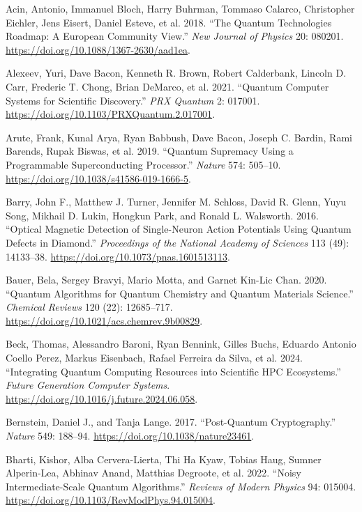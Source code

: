 \documentclass[
  11pt,
  letterpaper,
]{article}
\newlength{\cslhangindent}
\newenvironment{CSLReferences}[2] %
 {\begin{list}{}{%
  \setlength{\itemindent}{0pt}
  \setlength{\leftmargin}{0pt}
  \setlength{\parsep}{0pt}
  \ifodd #1
   \setlength{\leftmargin}{\cslhangindent}
   \setlength{\itemindent}{-1\cslhangindent}
  \fi
  \setlength{\itemsep}{#2\baselineskip}}}
 {\end{list}}
\begin{document}
\label{refs}
\begin{CSLReferences}{1}{0}
Acin, Antonio, Immanuel Bloch, Harry Buhrman, Tommaso Calarco,
Christopher Eichler, Jens Eisert, Daniel Esteve, et al. 2018. {``The
Quantum Technologies Roadmap: A European Community View.''} \emph{New
Journal of Physics} 20: 080201.
\url{https://doi.org/10.1088/1367-2630/aad1ea}.

Alexeev, Yuri, Dave Bacon, Kenneth R. Brown, Robert Calderbank, Lincoln
D. Carr, Frederic T. Chong, Brian DeMarco, et al. 2021. {``Quantum
Computer Systems for Scientific Discovery.''} \emph{PRX Quantum} 2:
017001. \url{https://doi.org/10.1103/PRXQuantum.2.017001}.

Arute, Frank, Kunal Arya, Ryan Babbush, Dave Bacon, Joseph C. Bardin,
Rami Barends, Rupak Biswas, et al. 2019. {``Quantum Supremacy Using a
Programmable Superconducting Processor.''} \emph{Nature} 574: 505--10.
\url{https://doi.org/10.1038/s41586-019-1666-5}.

Barry, John F., Matthew J. Turner, Jennifer M. Schloss, David R. Glenn,
Yuyu Song, Mikhail D. Lukin, Hongkun Park, and Ronald L. Walsworth.
2016. {``Optical Magnetic Detection of Single-Neuron Action Potentials
Using Quantum Defects in Diamond.''} \emph{Proceedings of the National
Academy of Sciences} 113 (49): 14133--38.
\url{https://doi.org/10.1073/pnas.1601513113}.

Bauer, Bela, Sergey Bravyi, Mario Motta, and Garnet Kin-Lic Chan. 2020.
{``Quantum Algorithms for Quantum Chemistry and Quantum Materials
Science.''} \emph{Chemical Reviews} 120 (22): 12685--717.
\url{https://doi.org/10.1021/acs.chemrev.9b00829}.

Beck, Thomas, Alessandro Baroni, Ryan Bennink, Gilles Buchs, Eduardo
Antonio Coello Perez, Markus Eisenbach, Rafael Ferreira da Silva, et al.
2024. {``Integrating Quantum Computing Resources into Scientific HPC
Ecosystems.''} \emph{Future Generation Computer Systems}.
\url{https://doi.org/10.1016/j.future.2024.06.058}.

Bernstein, Daniel J., and Tanja Lange. 2017. {``Post-Quantum
Cryptography.''} \emph{Nature} 549: 188--94.
\url{https://doi.org/10.1038/nature23461}.

Bharti, Kishor, Alba Cervera-Lierta, Thi Ha Kyaw, Tobias Haug, Sumner
Alperin-Lea, Abhinav Anand, Matthias Degroote, et al. 2022. {``Noisy
Intermediate-Scale Quantum Algorithms.''} \emph{Reviews of Modern
Physics} 94: 015004. \url{https://doi.org/10.1103/RevModPhys.94.015004}.


\end{CSLReferences}
\end{document}
